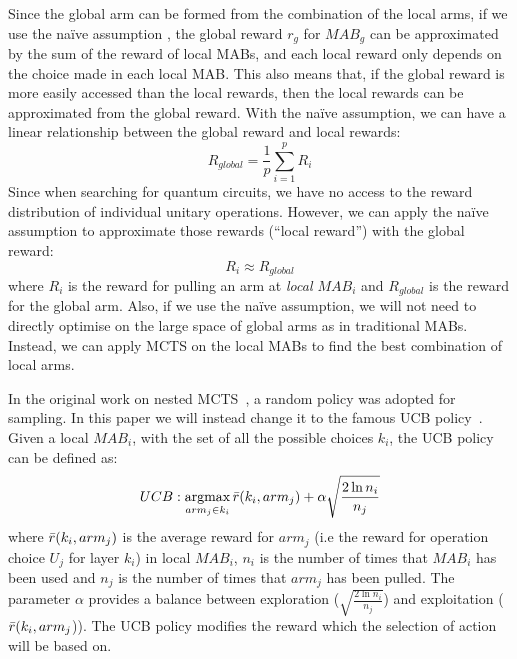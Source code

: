 \documentclass[a4paper,onecolumn,11pt]{quantumarticle}
\DeclareMathOperator*{\argmax}{argmax}
\begin{document}
Since the global arm can be formed from the combination of the local arms, if we use the na\"ive assumption \cite{CMAB_RTS}, the global reward $r_g$ for $MAB_g$ can be approximated by the sum of the reward of local MABs, and each local reward only depends on the choice made in each local MAB. This also means that, if the global reward is more easily accessed than the local rewards, then the local rewards can be approximated from the global reward. With the na\"ive assumption, we can have a linear relationship between the global reward and local rewards:
\begin{equation}
    R_{global} = \frac{1}{p}\sum_{i=1}^p R_i
\end{equation}
Since when searching for quantum circuits, we have no access to the reward distribution of individual unitary operations. However, we can apply the na\"ive assumption to approximate those rewards (``local reward'') with the global reward: 
\begin{equation}
    R_{i} \approx R_{global}
\end{equation}
where $R_{i}$ is the reward for pulling an arm at \textit{local $MAB_i$} and $R_{global}$ is the reward for the global arm.
Also, if we use the na\"ive assumption, we will not need to directly optimise on the large space of global arms as in  traditional MABs. Instead, we can apply MCTS on the local MABs to find the best combination of local arms.

In the original work on nested MCTS~\cite{nestedmontecarlosearch}, a random policy was adopted for sampling. In this paper we will instead change it to the famous UCB policy~\cite{UCB_paper_10.5555/944919.944941}. Given a local $MAB_i$, with the set of all the possible choices $k_i$, the UCB policy can be defined as:
\begin{equation}
    UCB: \argmax_{arm_j\in k_i} \Bar{r}(k_i, arm_j) + \alpha \sqrt{\frac{2\ln n_i}{n_j}}
\end{equation}
where $\Bar{r}(k_i, arm_j)$ is the average reward for $arm_j$ (i.e the reward for operation choice $U_j$  for layer $k_i$) in local $MAB_i$, $n_i$ is the number of times that $MAB_i$ has been used and $n_j$ is the number of times that $arm_j$ has been pulled. The parameter $\alpha$ provides a balance between exploration ($\sqrt{\frac{2\ln n_i}{n_j}}$) and exploitation ($\Bar{r}(k_i, arm_j$)). The UCB policy modifies the reward which the selection of action will be based on. 
\end{document}
